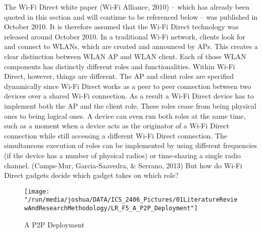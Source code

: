 \documentclass[12pt,svgnames,smaller]{article} %
\begin{document}
\begin{enumerate}
		The Wi-Fi Direct white paper (Wi-Fi Alliance, 2010) – which has already been quoted in this section and will continue to be referenced below – was published in October 2010. It is therefore assumed that the Wi-Fi Direct technology was released around October 2010.
		In a traditional Wi-Fi network, clients look for and connect to WLANs, which are created and announced by APs. This creates a clear distinction between WLAN AP and WLAN client. Each of those WLAN components has distinctly different roles and functionalities. Within Wi-Fi Direct, however, things are different. The AP and client roles are specified dynamically since Wi-Fi Direct works as a peer to peer connection between two devices over a shared Wi-Fi connection. As a result a Wi-Fi Direct device has to implement both the AP and the client role. These roles cease from being physical ones to being logical ones. A device can even run both roles at the same time, such as a moment when a device acts as the originator of a Wi-Fi Direct connection while still accessing a different Wi-Fi Direct connection. The simultaneous execution of roles can be implemented by using different frequencies (if the device has a number of physical radios) or time-sharing a single radio channel. (Camps-Mur, Garcia-Saavedra, \& Serrano, 2013) But how do Wi-Fi Direct gadgets decide which gadget takes on which role?
		
		\begin{figure}
			\centering
			\texttt{[image: "/run/media/joshua/DATA/ICS\_2406\_Pictures/01LiteratureReviewAndResearchMethodology/LR\_F5\_A\_P2P\_Deployment"]}
			\caption{A P2P Deployment}
			\label{fig:LiteratureReview-Figure5}
		\end{figure}
		

\end{enumerate}
\end{document}
